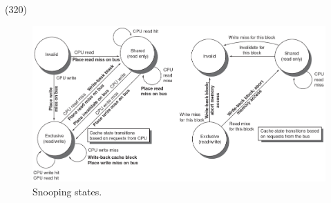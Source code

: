 \item \begin{theorem}{(320)} \quad\quad
    \begin{figure}[H]
        \centering
        \includegraphics[scale=0.5]{img/snooping.png}
        \caption{Snooping states.}
        \label{img:snooping}
    \end{figure}
\end{theorem}

